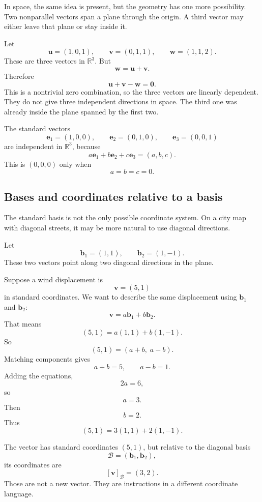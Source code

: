 In space, the same idea is present, but the geometry has one more possibility.  Two
nonparallel vectors span a plane through the origin.  A third vector may either leave
that plane or stay inside it.

\begin{example}
Let
\[
    \mathbf u=(1,0,1),\qquad
    \mathbf v=(0,1,1),\qquad
    \mathbf w=(1,1,2).
\]
These are three vectors in \(\mathbb R^3\).  But
\[
    \mathbf w=\mathbf u+\mathbf v.
\]
Therefore
\[
    \mathbf u+\mathbf v-\mathbf w=\mathbf 0.
\]
This is a nontrivial zero combination, so the three vectors are linearly dependent.
They do not give three independent directions in space.  The third one was already
inside the plane spanned by the first two.
\end{example}

The standard vectors
\[
    \mathbf e_1=(1,0,0),\qquad
    \mathbf e_2=(0,1,0),\qquad
    \mathbf e_3=(0,0,1)
\]
are independent in \(\mathbb R^3\), because
\[
    a\mathbf e_1+b\mathbf e_2+c\mathbf e_3
    =
    (a,b,c).
\]
This is \((0,0,0)\) only when
\[
    a=b=c=0.
\]

\subsection{Bases and coordinates relative to a basis}

The standard basis is not the only possible coordinate system.  On a city map with
diagonal streets, it may be more natural to use diagonal directions.

Let
\[
    \mathbf b_1=(1,1),\qquad
    \mathbf b_2=(1,-1).
\]
These two vectors point along two diagonal directions in the plane.

Suppose a wind displacement is
\[
    \mathbf v=(5,1)
\]
in standard coordinates.  We want to describe the same displacement using
\(\mathbf b_1\) and \(\mathbf b_2\):
\[
    \mathbf v=a\mathbf b_1+b\mathbf b_2.
\]
That means
\[
    (5,1)=a(1,1)+b(1,-1).
\]
So
\[
    (5,1)=(a+b,\;a-b).
\]
Matching components gives
\[
    a+b=5,\qquad a-b=1.
\]
Adding the equations,
\[
    2a=6,
\]
so
\[
    a=3.
\]
Then
\[
    b=2.
\]
Thus
\[
    (5,1)=3(1,1)+2(1,-1).
\]

The vector has standard coordinates \((5,1)\), but relative to the diagonal basis
\[
    \mathcal B=(\mathbf b_1,\mathbf b_2),
\]
its coordinates are
\[
    [\mathbf v]_{\mathcal B}=(3,2).
\]
Those are not a new vector.  They are instructions in a different coordinate language.


